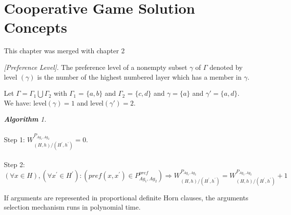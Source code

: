\setcounter{chapter}{3}

\chapter{Cooperative Game Solution Concepts}

This chapter was merged with chapter 2

\begin{definition}{\emph{[Preference Level].}} \label{preferenceLevel}
The preference level of a nonempty subset $\gamma$ of $\Gamma$ denoted by level $(\gamma)$ is the number of the highest numbered
layer which has a member in $\gamma$.
\end{definition}
\begin{example}
Let $\Gamma = \Gamma_1 \bigcup \Gamma_2 $ with $\Gamma_1$ = $\{ a, b\}$ and $\Gamma_2$ = $\{ c,d \}$ and $\gamma = \{a\}$ and
$\gamma\prime = \{a,d\}$. We have: level$(\gamma) = 1$ and level$(\gamma\prime) = 2$.
\end{example}


\begin{algorithm}{\emph{\textbf{Algorithm} 1.}} \label{algorithm1}\\
\\ Step 1:  $ W_{(H,h)/(H^{\prime},h^{\prime})}^{P_{Ag_1,Ag_2}} = 0 . $ \\
\\Step 2:  $(\forall x \in H),(\forall x^{\prime}  \in H^{\prime} ):
 ( pref(x,x^{\prime}) \in P_{Ag_1,Ag_2}^{pref})\Rightarrow W_{(H,h)/(H^{\prime},h^{\prime})}^{P_{Ag_1,Ag_2}} = W_{(H,h)/(H^{\prime},h^{\prime})}^{P_{Ag_1,Ag_2}}  +  1 $
\end{algorithm}


\begin{theorem}\label{Complexity1}
If arguments are represented in proportional definite Horn clauses, the arguments selection mechanism runs in polynomial time.
\end{theorem}

